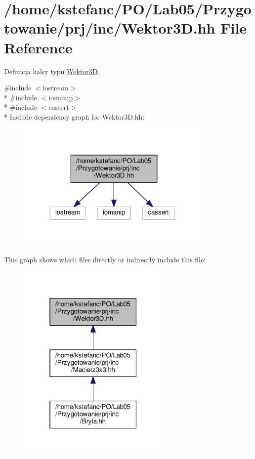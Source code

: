 \hypertarget{_wektor3_d_8hh}{\section{/home/kstefanc/\+P\+O/\+Lab05/\+Przygotowanie/prj/inc/\+Wektor3\+D.hh File Reference}
\label{_wektor3_d_8hh}
}


Definicja kalsy typu \hyperlink{class_wektor3_d}{Wektor3\+D}.  


{\ttfamily \#include $<$iostream$>$}\\*
{\ttfamily \#include $<$iomanip$>$}\\*
{\ttfamily \#include $<$cassert$>$}\\*
Include dependency graph for Wektor3\+D.\+hh\+:\nopagebreak
\begin{figure}[H]
\begin{center}
\leavevmode
\includegraphics[width=270pt]{_wektor3_d_8hh__incl}
\end{center}
\end{figure}
This graph shows which files directly or indirectly include this file\+:\nopagebreak
\begin{figure}[H]
\begin{center}
\leavevmode
\includegraphics[width=211pt]{_wektor3_d_8hh__dep__incl}
\end{center}
\end{figure}
